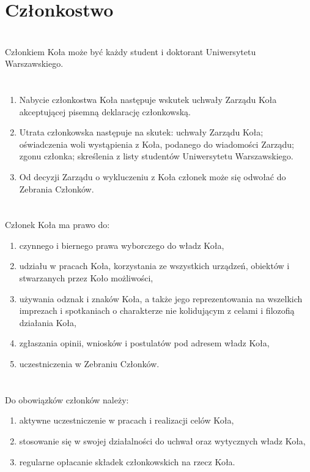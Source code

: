 \section*{Członkostwo~~~}
\section{}
Członkiem Koła może być każdy student i doktorant Uniwersytetu Warszawskiego.

\section{}
\begin{enumerate}
\item Nabycie członkostwa Koła następuje wskutek uchwały Zarządu Koła akceptującej pisemną deklarację członkowską.
\item Utrata członkowska następuje na skutek: uchwały Zarządu Koła; oświadczenia woli wystąpienia z Koła, podanego do wiadomości Zarządu; zgonu członka; skreślenia z listy studentów Uniwersytetu Warszawskiego.
\item Od decyzji Zarządu o wykluczeniu z Koła członek może się odwołać do Zebrania Członków.
\end{enumerate}

\section{}
Członek Koła ma prawo do:
\begin{enumerate}[label=\alph*)]
\item czynnego i biernego prawa wyborczego do władz Koła,
\item udziału w pracach Koła, korzystania ze wszystkich urządzeń, obiektów i stwarzanych przez Koło możliwości,
\item używania odznak i znaków Koła, a także jego reprezentowania na wszelkich imprezach i spotkaniach o charakterze nie kolidującym z celami i filozofią działania Koła,
\item zgłaszania opinii, wniosków i postulatów pod adresem władz Koła,
\item uczestniczenia w Zebraniu Członków.
\end{enumerate}

\section{}
Do obowiązków członków należy:
\begin{enumerate}[label=\alph*)]
\item aktywne uczestniczenie w pracach i realizacji celów Koła,
\item stosowanie się w swojej działalności do uchwał oraz wytycznych władz Koła,
\item regularne opłacanie składek członkowskich na rzecz Koła.
\end{enumerate}

